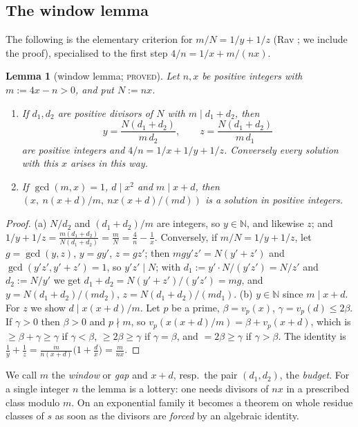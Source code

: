 \documentclass[11pt,reqno]{amsart}
\newtheorem{lemma}[theorem]{Lemma}
\theoremstyle{definition}
\newcommand{\N}{\mathbb N}
\newcommand{\status}[1]{\textup{\textsc{#1}}}
\begin{document}
\subsection{The window lemma}
The following is the elementary criterion for $m/N=1/y+1/z$ (Rav
\cite{Rav}; we include the proof), specialised to the first step
$4/n=1/x+m/(nx)$.

\begin{lemma}[window lemma; \status{proved}]\label{lem:window}
Let $n,x$ be positive integers with $m:=4x-n>0$, and put $N:=nx$.
\begin{enumerate}
\item[(a)] If $d_1,d_2$ are positive divisors of $N$ with
$m\mid d_1+d_2$, then
\[
 y=\frac{N(d_1+d_2)}{m\,d_2},\qquad z=\frac{N(d_1+d_2)}{m\,d_1}
\]
are positive integers and $4/n=1/x+1/y+1/z$.  Conversely every solution
with this $x$ arises in this way.
\item[(b)] If $\gcd(m,x)=1$, $d\mid x^2$ and $m\mid x+d$, then
$(x,\ n(x+d)/m,\ nx(x+d)/(md))$ is a solution in positive integers.
\end{enumerate}
\end{lemma}

\begin{proof}
(a) $N/d_2$ and $(d_1+d_2)/m$ are integers, so $y\in\N$, and likewise $z$;
and $1/y+1/z=\frac{m(d_1+d_2)}{N(d_1+d_2)}=\frac mN=\frac4n-\frac1x$.
Conversely, if $m/N=1/y+1/z$, let $g=\gcd(y,z)$, $y=gy'$, $z=gz'$; then
$mgy'z'=N(y'+z')$ and $\gcd(y'z',y'+z')=1$, so $y'z'\mid N$; with
$d_1:=y'\cdot N/(y'z')=N/z'$ and $d_2:=N/y'$ we get $d_1+d_2=N(y'+z')/(y'z')=mg$,
and $y=N(d_1+d_2)/(md_2)$, $z=N(d_1+d_2)/(md_1)$.
(b) $y\in\N$ since $m\mid x+d$.  For $z$ we show $d\mid x(x+d)/m$.  Let $p$
be a prime, $\beta=v_p(x)$, $\gamma=v_p(d)\le2\beta$.  If $\gamma>0$ then
$\beta>0$ and $p\nmid m$, so $v_p(x(x+d)/m)=\beta+v_p(x+d)$, which is
$\ge\beta+\gamma\ge\gamma$ if $\gamma<\beta$, $\ge2\beta\ge\gamma$ if
$\gamma=\beta$, and $=2\beta\ge\gamma$ if $\gamma>\beta$.  The identity is
$\frac1y+\frac1z=\frac{m}{n(x+d)}\bigl(1+\frac dx\bigr)=\frac m{nx}$.
\end{proof}

We call $m$ the \emph{window} or \emph{gap} and $x+d$, resp.\ the pair
$(d_1,d_2)$, the \emph{budget}.  For a single integer $n$ the lemma is a
lottery: one needs divisors of $nx$ in a prescribed class modulo $m$.  On an
exponential family it becomes a theorem on whole residue classes of $s$ as
soon as the divisors are \emph{forced} by an algebraic identity.
\end{document}
